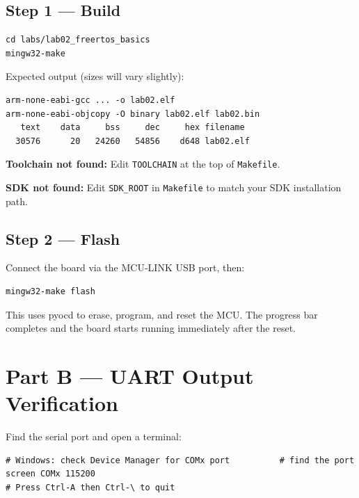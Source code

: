 \documentclass[11pt, a4paper]{article}
\newcommand{\file}[1]{\texttt{\small #1}}
\begin{document}
\subsection{Step 1 --- Build}

\begin{lstlisting}[style=bashstyle]
cd labs/lab02_freertos_basics
mingw32-make
\end{lstlisting}

Expected output (sizes will vary slightly):

\begin{lstlisting}[style=textstyle]
arm-none-eabi-gcc ... -o lab02.elf
arm-none-eabi-objcopy -O binary lab02.elf lab02.bin
   text    data     bss     dec     hex filename
  30576      20   24260   54856    d648 lab02.elf
\end{lstlisting}

\begin{warnbox}
  \textbf{Toolchain not found:} Edit \texttt{TOOLCHAIN} at the top of \file{Makefile}.

  \medskip
  \textbf{SDK not found:} Edit \texttt{SDK\_ROOT} in \file{Makefile} to match your
  SDK installation path.
\end{warnbox}

\subsection{Step 2 --- Flash}

Connect the board via the MCU-LINK USB port, then:

\begin{lstlisting}[style=bashstyle]
mingw32-make flash
\end{lstlisting}

This uses pyocd to erase, program, and reset the MCU.
The progress bar completes and the board starts running immediately after the reset.

\section{Part B --- UART Output Verification}

Find the serial port and open a terminal:

\begin{lstlisting}[style=bashstyle]
# Windows: check Device Manager for COMx port          # find the port
screen COMx 115200
# Press Ctrl-A then Ctrl-\ to quit
\end{lstlisting}
\end{document}
